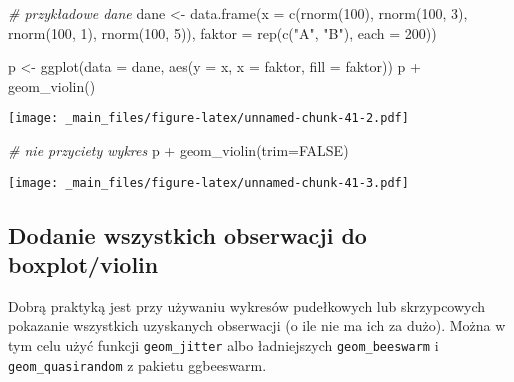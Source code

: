 \documentclass[
]{book}
\newenvironment{Shaded}{\begin{snugshade}}{\end{snugshade}}
\newcommand{\AttributeTok}[1]{\textcolor[rgb]{0.77,0.63,0.00}{#1}}
\newcommand{\CommentTok}[1]{\textcolor[rgb]{0.56,0.35,0.01}{\textit{#1}}}
\newcommand{\ConstantTok}[1]{\textcolor[rgb]{0.00,0.00,0.00}{#1}}
\newcommand{\DecValTok}[1]{\textcolor[rgb]{0.00,0.00,0.81}{#1}}
\newcommand{\FunctionTok}[1]{\textcolor[rgb]{0.00,0.00,0.00}{#1}}
\newcommand{\NormalTok}[1]{#1}
\newcommand{\OtherTok}[1]{\textcolor[rgb]{0.56,0.35,0.01}{#1}}
\newcommand{\SpecialCharTok}[1]{\textcolor[rgb]{0.00,0.00,0.00}{#1}}
\newcommand{\StringTok}[1]{\textcolor[rgb]{0.31,0.60,0.02}{#1}}
\begin{document}
\begin{Shaded}
\begin{Highlighting}[]
\CommentTok{\# przykładowe dane}
\NormalTok{dane }\OtherTok{\textless{}{-}} \FunctionTok{data.frame}\NormalTok{(}\AttributeTok{x =} \FunctionTok{c}\NormalTok{(}\FunctionTok{rnorm}\NormalTok{(}\DecValTok{100}\NormalTok{), }\FunctionTok{rnorm}\NormalTok{(}\DecValTok{100}\NormalTok{, }\DecValTok{3}\NormalTok{), }\FunctionTok{rnorm}\NormalTok{(}\DecValTok{100}\NormalTok{, }\DecValTok{1}\NormalTok{), }\FunctionTok{rnorm}\NormalTok{(}\DecValTok{100}\NormalTok{, }\DecValTok{5}\NormalTok{)), }
                   \AttributeTok{faktor =} \FunctionTok{rep}\NormalTok{(}\FunctionTok{c}\NormalTok{(}\StringTok{"A"}\NormalTok{, }\StringTok{"B"}\NormalTok{), }\AttributeTok{each =} \DecValTok{200}\NormalTok{))}

\NormalTok{p }\OtherTok{\textless{}{-}} \FunctionTok{ggplot}\NormalTok{(}\AttributeTok{data =}\NormalTok{ dane, }\FunctionTok{aes}\NormalTok{(}\AttributeTok{y =}\NormalTok{ x, }\AttributeTok{x =}\NormalTok{ faktor, }\AttributeTok{fill =}\NormalTok{ faktor))}
\NormalTok{p }\SpecialCharTok{+} \FunctionTok{geom\_violin}\NormalTok{()}
\end{Highlighting}
\end{Shaded}

\texttt{[image: \_main\_files/figure-latex/unnamed-chunk-41-2.pdf]}

\begin{Shaded}
\begin{Highlighting}[]
\CommentTok{\# nie przyciety wykres}
\NormalTok{p }\SpecialCharTok{+} \FunctionTok{geom\_violin}\NormalTok{(}\AttributeTok{trim=}\ConstantTok{FALSE}\NormalTok{)}
\end{Highlighting}
\end{Shaded}

\texttt{[image: \_main\_files/figure-latex/unnamed-chunk-41-3.pdf]}

\hypertarget{dodanie-wszystkich-obserwacji-do-boxplotviolin}{%
\subsection{Dodanie wszystkich obserwacji do boxplot/violin}\label{dodanie-wszystkich-obserwacji-do-boxplotviolin}}

Dobrą praktyką jest przy używaniu wykresów pudełkowych lub skrzypcowych pokazanie wszystkich uzyskanych obserwacji (o ile nie ma ich za dużo). Można w tym celu użyć funkcji \texttt{geom\_jitter} albo ładniejszych \texttt{geom\_beeswarm} i \texttt{geom\_quasirandom} z pakietu ggbeeswarm.
\end{document}
